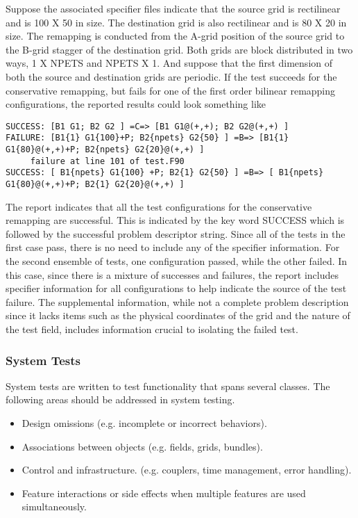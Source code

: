 Suppose the associated specifier files indicate that the source  grid is rectilinear
and is 100 X 50 in size. The destination grid is also rectilinear and is 80 X 20 
in size. The remapping is conducted from the A-grid position of the source grid to 
the B-grid stagger of the destination grid. Both grids are block distributed in two 
ways, 1 X NPETS and NPETS X 1. And suppose that the first dimension of both the
source and destination grids are periodic. If the test succeeds for the conservative
remapping, but fails for one of the first order bilinear remapping configurations, the reported results
could look something like

\begin{verbatim}
SUCCESS: [B1 G1; B2 G2 ] =C=> [B1 G1@(+,+); B2 G2@(+,+) ] 
FAILURE: [B1{1} G1{100}+P; B2{npets} G2{50} ] =B=> [B1{1} G1{80}@(+,+)+P; B2{npets} G2{20}@(+,+) ] 
     failure at line 101 of test.F90
SUCCESS: [ B1{npets} G1{100} +P; B2{1} G2{50} ] =B=> [ B1{npets} G1{80}@(+,+)+P; B2{1} G2{20}@(+,+) ] 
\end{verbatim}

The report indicates that all the test configurations for the conservative remapping 
are successful. This is indicated by the key word SUCCESS which is followed by the 
successful problem descriptor string. Since all of the tests in the first case pass,
there is no need to include any of the specifier information. For the second
ensemble of tests, one configuration passed, while the other failed. In this case,
since there is a mixture of successes and failures, the report includes 
specifier information for all configurations to help indicate the source of the
test failure. The supplemental information, while not a complete problem description
since it lacks items such as the physical coordinates of the grid and the nature of the test field, includes information crucial to isolating the failed test.

\subsubsection{System Tests}

System tests are written to test functionality that spans several 
classes.  The following areas should be addressed in system testing.

\begin{itemize}
\item Design omissions (e.g. incomplete or incorrect behaviors).
\item Associations between objects (e.g. fields, grids, bundles).
\item Control and infrastructure. (e.g. couplers, time management, error handling).
\item Feature interactions or side effects when multiple features are used
simultaneously.
\end{itemize}

